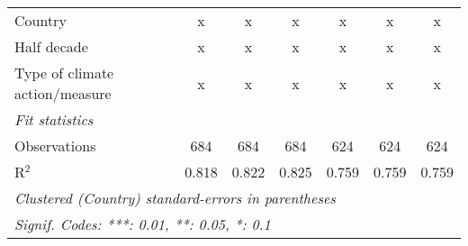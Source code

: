 \begin{tabular}{lcccccc}
   Country                                                 & x       & x             & x             & x             & x             & x\\  
   Half decade                                             & x       & x             & x             & x             & x             & x\\  
   Type of climate action/measure                          & x       & x             & x             & x             & x             & x\\  
   \midrule \emph{Fit statistics}\\
   Observations                                            & 684     & 684           & 684           & 624           & 624           & 624\\  
   R$^2$                                                   & 0.818   & 0.822         & 0.825         & 0.759         & 0.759         & 0.759\\  
   \midrule
   \multicolumn{7}{l}{\emph{Clustered (Country) standard-errors in parentheses}}\\
   \multicolumn{7}{l}{\emph{Signif. Codes: ***: 0.01, **: 0.05, *: 0.1}}\\
\end{tabular}
\par\endgroup


